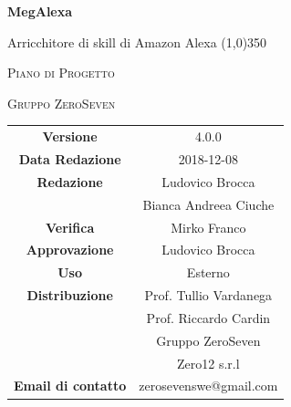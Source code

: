 \documentclass[a4paper,12pt, openany]{book}
\author{Mirko Franco}
\date{2018-11-26}
\begin{document}
\begin{titlepage}
	\centering
	{\huge\bfseries MegAlexa\par}
	Arricchitore di skill di Amazon Alexa
	\line(1,0){350} \\
	{\scshape\LARGE Piano di Progetto \par}
	\vspace{1cm}
	{\scshape Gruppo ZeroSeven \par}
	\logo
	\begin{tabular}{c|c}
		{\hfill \textbf{Versione}} 			& 4.0.0    \\
		{\hfill\textbf{Data Redazione}} 	& 2018-12-08\\ 
		{\hfill\textbf{Redazione}} 			&Ludovico Brocca\\ & Bianca Andreea Ciuche\\
		{\hfill\textbf{Verifica}} 		&  	Mirko Franco\\
		{\hfill\textbf{Approvazione}} 		&  		Ludovico Brocca	\\ 
		{\hfill\textbf{Uso}} 					& 		Esterno		\\ 
		{\hfill\textbf{Distribuzione}} 			& 			Prof. Tullio Vardanega \\ & Prof. Riccardo Cardin \\ & Gruppo ZeroSeven		\\ & Zero12 s.r.l \\ 
		{\hfill\textbf{Email di contatto}} & zerosevenswe@gmail.com \\
	\end{tabular}
\end{titlepage}
	\label{LastFrontPage}
	\newpage	
	
	\pagestyle{mymain}
	\tableofcontents
	\listoftables
	\listoffigures
	
	
	
	
	
	\begin{appendices}
		
		
	\end{appendices}
	\label{LastPage}
\end{document}
